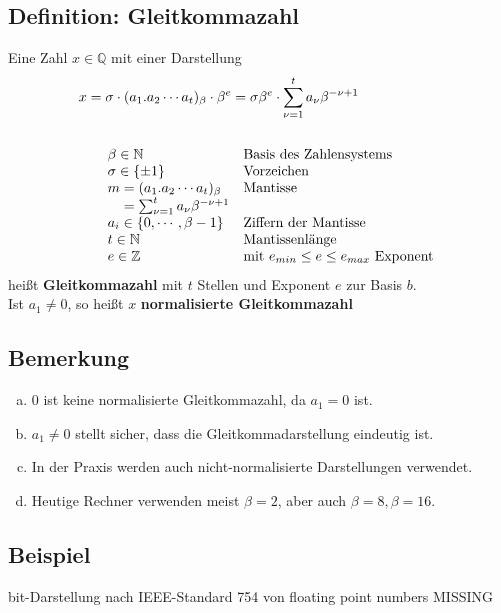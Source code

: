 \documentclass[ngerman,fontsize=11pt, paper=a4, parskip=false, titlepage=false, toc=bib]{scrbook}
\newcommand{\Q}{\mathbb{Q}}
\newcommand{\N}{\mathbb{N}}
\newcommand{\Z}{\mathbb{Z}}
\begin{document}
\subsection{Definition: Gleitkommazahl} \label{3.1.1} 
Eine Zahl $x\in\Q$ mit einer Darstellung
\begin{align*}
	x&=\sigma \cdot(a_1 . a_2 \cdots a_t)_{\beta}\cdot \beta^e 
	 = \sigma\beta^e \cdot \sum_{\nu=1}^{t}a_\nu \beta^{-\nu+1}\\\\
&\quad\begin{array}{ll}
	\beta\in\N & \text{Basis des Zahlensystems}\index{Basis}\\
	\sigma \in\{\pm 1\} &\text{Vorzeichen} \\
	m = (a_1 . a_2 \cdots a_t)_{\beta} &\text{Mantisse}\index{Mantisse}\\
	\phantom{m}= \sum_{\nu=1}^{t}a_\nu \beta^{-\nu+1} \\
	a_i \in\{0,\cdots , \beta-1\}&\text{Ziffern der Mantisse}\\
	t\in\N&\text{Mantissenlänge} \\
	e\in\Z &\text{mit }e_{min}\leq e \leq e_{max} \text{ Exponent}
\end{array}
\end{align*}
heißt \textbf{Gleitkommazahl} mit $t$ Stellen und Exponent $e$ zur Basis $b$. \\
Ist $a_1\neq 0$, so heißt $x$ \textbf{normalisierte Gleitkommazahl}

\subsection{Bemerkung} \label{3.1.2}
\begin{enumerate}[a)]
	\item 0 ist keine normalisierte Gleitkommazahl, da $a_1 =  0$ ist.
	\item $a_1\neq 0$ stellt sicher, dass die Gleitkommadarstellung eindeutig ist.
	\item In der Praxis werden auch nicht-normalisierte Darstellungen verwendet.
	\item Heutige Rechner verwenden meist $\beta =2$, aber auch $\beta=8, \beta=16$.
\end{enumerate}

\subsection{Beispiel} \label{3.1.3}
 bit-Darstellung nach IEEE-Standard 754 von floating point numbers
 MISSING
 
\end{document}
